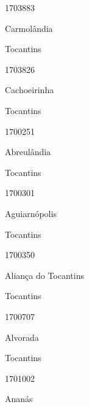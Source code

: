 \documentclass[
  letterpaper,
]{report}
\begin{document}
1703883

\n      

Carmolândia

\n    

\n    

\n      

Tocantins

\n      

1703826

\n      

Cachoeirinha

\n    

\n    

\n      

Tocantins

\n      

1700251

\n      

Abreulândia

\n    

\n    

\n      

Tocantins

\n      

1700301

\n      

Aguiarnópolis

\n    

\n    

\n      

Tocantins

\n      

1700350

\n      

Aliança do Tocantins

\n    

\n    

\n      

Tocantins

\n      

1700707

\n      

Alvorada

\n    

\n    

\n      

Tocantins

\n      

1701002

\n      

Ananás

\n    

\n    
\end{document}
